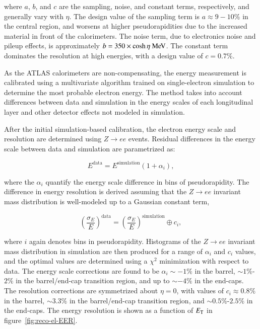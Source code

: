 where $a$, $b$, and $c$ are the sampling, noise, and constant terms, respectively, and generally vary with $\eta$. The design value of the sampling term is $a\approx 9-10\%$ in the central region, and worsens at higher pseudorapidities due to the increased material in front of the calorimeters. The noise term, due to electronics noise and pileup effects, is approximately $b = 350 \times \cosh\eta \MeV$. The constant term dominates the resolution at high energies, with a design value of $c=0.7\%$. 

As the ATLAS calorimeters are non-compensating, the energy measurement is calibrated using a multivariate algorithm trained on single-electron simulation to determine the most probable electron energy. The method takes into account differences between data and simulation in the energy scales of each longitudinal layer and other detector effects not modeled in simulation. 

After the initial simulation-based calibration, the electron energy scale and resolution are determined using $Z\rightarrow ee$ events. Residual differences in the energy scale between data and simulation are parametrized as:

\begin{equation}
	E^{\mathrm{data}} = E^{\mathrm{simulation}} (1 + \alpha_i),
\end{equation}

where the $\alpha_i$ quantify the energy scale difference in bins of pseudorapidity. The difference in energy resolution is derived assuming that the $Z\rightarrow ee$ invariant mass distribution is well-modeled up to a Gaussian constant term, 

\begin{equation}
	\left(\frac{\sigma_E}{E}\right)^{\mathrm{data}} = \left(\frac{\sigma_E}{E}\right)^{\mathrm{simulation}} \oplus c_i,
\end{equation}

where $i$ again denotes bins in pseudorapidity. Histograms of the $Z\rightarrow ee$ invariant mass distribution in simulation are then produced for a range of $\alpha_i$ and $c_i$ values, and the optimal values are determined using a $\chi^2$ minimization with respect to data. The energy scale corrections are found to be $\alpha_i\sim -1\%$ in the barrel, $\sim1\%$-$2\%$ in the barrel/end-cap transition region, and up to $\sim-4\%$ in the end-caps. The resolution corrections are symmetrized about $\eta=0$, with values of $c_i\approx 0.8\%$ in the barrel, $\sim3.3\%$ in the barrel/end-cap transition region, and $\sim0.5\%$-$2.5\%$ in the end-caps. The energy resolution is shown as a function of $E_{\text{T}}$ in figure~\ref{fig:reco-el-EER}.


